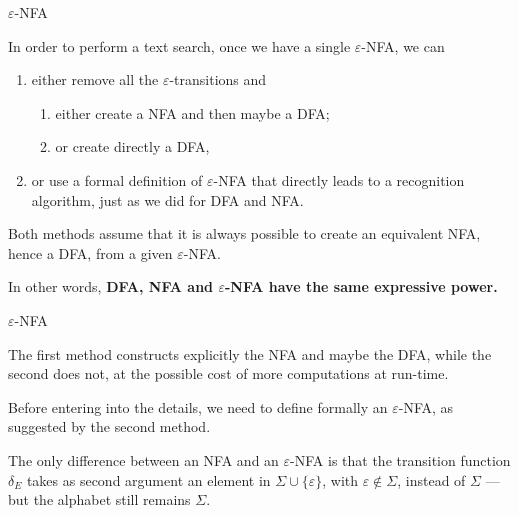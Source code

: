 \documentclass[compress,dvips,xcolor={dvipsnames},t]{beamer}
\newcommand\eNFA{\(\varepsilon\)-NFA\xspace}
\begin{document}
%
\begin{frame}{\eNFA}

In order to perform a text search, once we have a single \eNFA, we can
\begin{enumerate}

  \item either remove all the \(\varepsilon\)-transitions and
  \begin{enumerate}
    \item either create a NFA and then maybe a DFA;

    \item or create directly a DFA,

  \end{enumerate}

  \item or use a formal definition of \eNFA that directly leads to a
  recognition algorithm, just as we did for DFA and NFA.

\end{enumerate}
Both methods assume that it is always possible to create an equivalent
NFA, hence a DFA, from a given \eNFA.

\bigskip

In other words, \textbf{DFA, NFA and \eNFA have the same expressive
  power.}

\end{frame}

%
\begin{frame}{\eNFA}

The first method constructs explicitly the NFA and maybe the DFA,
while the second does not, at the possible cost of more computations
at run-time.

\bigskip

Before entering into the details, we need to define formally an
\eNFA, as suggested by the second method.

\bigskip

The only difference between an NFA and an \eNFA is that the
transition function \(\delta_E\) takes as second argument an element
in \(\Sigma \cup \{\varepsilon\}\), with \(\varepsilon \not\in \Sigma\),
instead of \(\Sigma\) --- but the alphabet still remains \(\Sigma\).

\end{frame}
\end{document}
